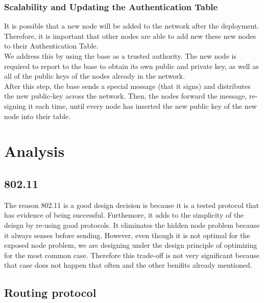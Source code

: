 \documentclass[letterpaper]{article}
\begin{document}
\subsubsection{Scalability and Updating the Authentication Table}


It is possible that a new node will be added to the network after the deployment. 
Therefore, it is important that other nodes are able to add new these new nodes to their Authentication Table.
\\

\noindent We address this by using the base as a trusted authority. The new node is required to report to the base
to obtain its own public and private key, as well as all of the public keys of the nodes already in the network.
\\

\noindent After this step, the base sends a special message (that it signs) and distributes the new public-key across the network. 
Then, the nodes forward the message, re-signing it each time, until every node has inserted the new public key of the new node into their table.

\section{Analysis}

\subsection{802.11}
The reason 802.11 is a good design decision is because it is a tested protocol that has evidence of being successful. Furthemore, it adds to the simplicity of the deisgn by re-using good protocols. It eliminates the hidden node problem because it always senses before sending. However, even though it is not optimal for the exposed node problem, we are designing under the design principle of optimizing for the most common case. Therefore this trade-off is not very significant because that case does not happen that often and the other benifits already mentioned.

\subsection{Routing protocol}
\end{document}
